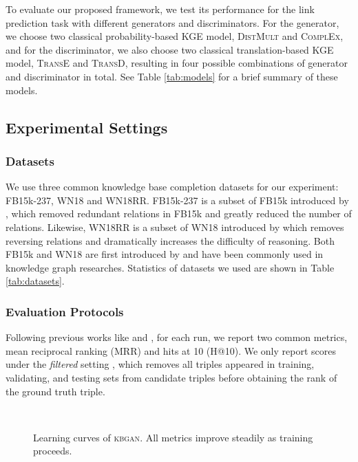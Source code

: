 \documentclass[11pt,a4paper]{article}
\begin{document}
To evaluate our proposed framework, we test its performance for the link prediction task with different generators and discriminators. For the generator, we choose two classical probability-based KGE model, \textsc{DistMult} and \textsc{ComplEx}, and for the discriminator,  we also choose two classical translation-based KGE model, \textsc{TransE} and \textsc{TransD}, resulting in four possible combinations of generator and discriminator in total. See Table \ref{tab:models} for a brief summary of these models.

\subsection{Experimental Settings}
\subsubsection{Datasets}
We use three common knowledge base completion datasets for our experiment: FB15k-237, WN18 and WN18RR. FB15k-237 is a subset of FB15k introduced by \cite{Toutanova2015}, which removed redundant relations in FB15k and greatly reduced the number of relations. Likewise, WN18RR is a subset of WN18 introduced by \cite{conve} which removes reversing relations and dramatically increases the difficulty of reasoning. Both FB15k and WN18 are first introduced by \cite{bordes2013translating} and have been commonly used in knowledge graph researches. Statistics of datasets we used are shown in Table \ref{tab:datasets}.

\subsubsection{Evaluation Protocols}
Following previous works like \cite{yang2015embedding} and \cite{trouillon2016complex}, for each run, we report two common metrics, mean reciprocal ranking (MRR) and hits at 10 (H@10). We only report scores under the \emph{filtered} setting \cite{bordes2013translating}, which removes all triples appeared in training, validating, and testing sets from candidate triples before obtaining the rank of the ground truth triple.

\begin{figure*}[!t]
\centering
{}
\\
\caption{Learning curves of \textsc{kbgan}. All metrics improve steadily as training proceeds.}
\label{fig:curves} 
\end{figure*}
\end{document}
